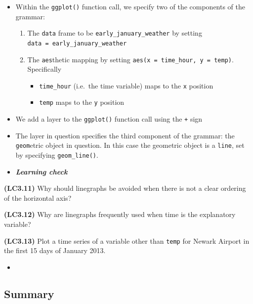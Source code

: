 \documentclass[12pt,]{krantz}
\providecommand{\tightlist}{%
  \setlength{\itemsep}{0pt}\setlength{\parskip}{0pt}}
\newenvironment{rmdblock}[1]
  {\begin{shaded*}
  \begin{itemize}
  \renewcommand{\labelitemi}{
    \raisebox{-.7\height}[0pt][0pt]{
    }
  }
  \item
  }
  {
  \end{itemize}
  \end{shaded*}
  }
\newenvironment{learncheck}
  {\begin{rmdblock}{warning}}
  {\end{rmdblock}}
\begin{document}
\begin{itemize}
\tightlist
\item
  Within the \texttt{ggplot()} function call, we specify two of the
  components of the grammar:

  \begin{enumerate}
  \def\labelenumi{\arabic{enumi}.}
  \tightlist
  \item
    The \texttt{data} frame to be \texttt{early\_january\_weather} by
    setting \texttt{data\ =\ early\_january\_weather}
  \item
    The \texttt{aes}thetic mapping by setting
    \texttt{aes(x\ =\ time\_hour,\ y\ =\ temp)}. Specifically

    \begin{itemize}
    \tightlist
    \item
      \texttt{time\_hour} (i.e.~the time variable) maps to the
      \texttt{x} position
    \item
      \texttt{temp} maps to the \texttt{y} position
    \end{itemize}
  \end{enumerate}
\item
  We add a layer to the \texttt{ggplot()} function call using the
  \texttt{+} sign
\item
  The layer in question specifies the third component of the grammar:
  the \texttt{geom}etric object in question. In this case the geometric
  object is a \texttt{line}, set by specifying \texttt{geom\_line()}.
\end{itemize}

\begin{learncheck}
\textbf{\emph{Learning check}}
\end{learncheck}

\textbf{(LC3.11)} Why should linegraphs be avoided when there is not a
clear ordering of the horizontal axis?

\textbf{(LC3.12)} Why are linegraphs frequently used when time is the
explanatory variable?

\textbf{(LC3.13)} Plot a time series of a variable other than
\texttt{temp} for Newark Airport in the first 15 days of January 2013.

\begin{learncheck}

\end{learncheck}

\subsection{Summary}\label{summary-1}
\end{document}
